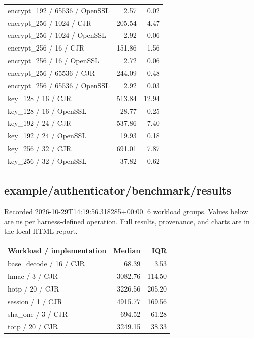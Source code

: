 \begin{longtable}{p{}rr}
encrypt\_192 / 65536 / OpenSSL & 2.57 & 0.02 \\
encrypt\_256 / 1024 / CJR & 205.54 & 4.47 \\
encrypt\_256 / 1024 / OpenSSL & 2.92 & 0.06 \\
encrypt\_256 / 16 / CJR & 151.86 & 1.56 \\
encrypt\_256 / 16 / OpenSSL & 2.72 & 0.06 \\
encrypt\_256 / 65536 / CJR & 244.09 & 0.48 \\
encrypt\_256 / 65536 / OpenSSL & 2.92 & 0.03 \\
key\_128 / 16 / CJR & 513.84 & 12.94 \\
key\_128 / 16 / OpenSSL & 28.77 & 0.25 \\
key\_192 / 24 / CJR & 537.86 & 7.40 \\
key\_192 / 24 / OpenSSL & 19.93 & 0.18 \\
key\_256 / 32 / CJR & 691.01 & 7.87 \\
key\_256 / 32 / OpenSSL & 37.82 & 0.62 \\
\end{longtable}
\subsection{example/authenticator/benchmark/results}
Recorded 2026-10-29T14:19:56.318285+00:00. 6 workload groups. Values below are ns per harness-defined operation. Full results, provenance, and charts are in the local HTML report.
\begin{longtable}{p{}rr}Workload / implementation & Median & IQR \\ \hline
base\_decode / 16 / CJR & 68.39 & 3.53 \\
hmac / 3 / CJR & 3082.76 & 114.50 \\
hotp / 20 / CJR & 3226.56 & 205.20 \\
session / 1 / CJR & 4915.77 & 169.56 \\
sha\_one / 3 / CJR & 694.52 & 61.28 \\
totp / 20 / CJR & 3249.15 & 38.33 \\
\end{longtable}
